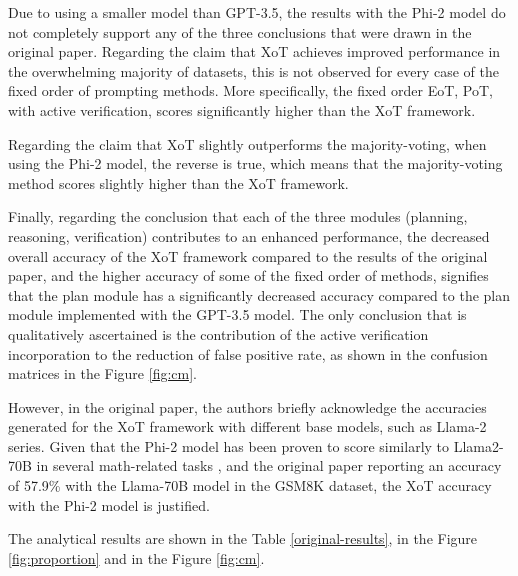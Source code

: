 \documentclass[10pt]{article} %
\begin{document}
Due to using a smaller model than GPT-3.5, the results with the Phi-2 model do not completely support any of the three conclusions that were drawn in the original paper. Regarding the claim that XoT achieves improved performance in the overwhelming majority of datasets, this is not observed for every case of the fixed order of prompting methods. More specifically, the fixed order EoT, PoT, with active verification, scores significantly higher than the XoT framework. 

Regarding the claim that XoT slightly outperforms the majority-voting, when using the Phi-2 model, the reverse is true, which means that the majority-voting method scores slightly higher than the XoT framework. 

Finally, regarding the conclusion that each of the three modules (planning, reasoning, verification) contributes to an enhanced performance, the decreased overall accuracy of the XoT framework compared to the results of the original paper, and the higher accuracy of some of the fixed order of methods, signifies that the plan module has a significantly decreased accuracy compared to the plan module implemented with the GPT-3.5 model. The only conclusion that is qualitatively ascertained is the contribution of the active verification incorporation to the reduction of false positive rate, as shown in the confusion matrices in the Figure \ref{fig:cm}.

However, in the original paper, the authors briefly acknowledge the accuracies generated for the XoT framework with different base models, such as Llama-2 series. Given that the Phi-2 model has been proven to score similarly to Llama2-70B in several math-related tasks \citep{microsoft2023phi2}, and the original paper reporting an accuracy of 57.9\% with the Llama-70B model in the GSM8K dataset, the XoT accuracy with the Phi-2 model is justified.

The analytical results are shown in the Table \ref{original-results}, in the Figure \ref{fig:proportion} and in the Figure \ref{fig:cm}.
\end{document}
